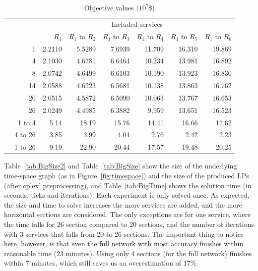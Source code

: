 \begin{table}
\begin{small}
\begin{center}
\begin{tabular}{lr|rrrrrr}
&						 			  &  \multicolumn{6}{c}{Included services}\\		
&									  & $R_1$		& $R_1$ to $R_2$&$R_1$ to $R_3$&$R_1$ to $R_4$&$R_1$ to $R_5$&$R_1$ to $R_6$\\		
\hline
\parbox[t]{2mm}{}
&1									& 2.2110	& 5.5289	&   7.6939	& 11.709	&	16.310	&	19.869\\
&4									& 2.1030	& 4.6781	&   6.6464	& 10.234	&	13.981	&	16.892\\
&8									& 2.0742	& 4.6499	&   6.6103	& 10.190	&	13.923	&	16.830\\
&14									& 2.0588	& 4.6223	&   6.5681	& 10.138	&	13.863	&	16.762\\
&20									& 2.0515	& 4.5872	&   6.5090	& 10.063	&	13.767	&	16.653\\
&26									& 2.0249	& 4.4985	&   6.3882	&  9.959	&	13.651	&	16.523\\
\hline                                   
\parbox[t]{2mm}{}
&1 to 4	&   5.14	&  18.19	&    15.76	&  14.41	&	 16.66	&	 17.62\\	
&4 to 26	&   3.85	&   3.99	&     4.04	&   2.76	&	  2.42	&	  2.23\\
&1 to 26	&   9.19	&  22.90	&    20.44	&  17.57	&	 19.48	&	 20.25\\
\end{tabular}
\end{center}
\caption{Objective values ($10^7$\$)}\label{tab:BigObj}
\end{small}
\end{table}

Table~\ref{tab:BigSize2} and Table~\ref{tab:BigSize} show the size of the underlying time-space graph (as in Figure~\ref{fig:timespace}) and the size of the produced LPs (after cplex' preprocessing), and Table~\ref{tab:BigTime} shows the solution time (in seconds, ticks and iterations). Each experiment is only solved once. As expected, the size and time to solve increases the more services are added, and the more horizontal sections are considered. The only exceptions are for one service, where the time falls for 26 section compared to 20 sections, and the number of iterations with 3 services that falls from 20 to 26 sections. The important thing to notice here, however, is that even the full network with most accuracy finishes within reasonable time (23 minutes). Using only 4 sections (for the full network) finishes within 7 minutes, which still saves us an overestimation of 17\%.

